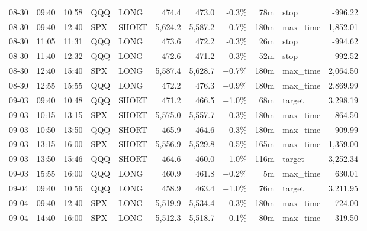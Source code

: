 \documentclass[11pt,a4paper,twoside]{article}
\begin{document}
\begin{center}
\begin{longtable}{>{\color{txtmain}}l l l l l r r r r >{\color{txtmain}}l r}
08-30 & 09:40 & 10:58 & QQQ & LONG & 474.4 & 473.0 & \textcolor{lossred}{-0.3\%} & 78m & stop & \textcolor{lossred}{-996.22} \\
08-30 & 09:40 & 12:40 & SPX & SHORT & 5,624.2 & 5,587.2 & \textcolor{wingreen}{+0.7\%} & 180m & max\_time & \textcolor{wingreen}{1,852.01} \\
08-30 & 11:05 & 11:31 & QQQ & LONG & 473.6 & 472.2 & \textcolor{lossred}{-0.3\%} & 26m & stop & \textcolor{lossred}{-994.62} \\
08-30 & 11:40 & 12:32 & QQQ & LONG & 472.6 & 471.2 & \textcolor{lossred}{-0.3\%} & 52m & stop & \textcolor{lossred}{-992.52} \\
08-30 & 12:40 & 15:40 & SPX & LONG & 5,587.4 & 5,628.7 & \textcolor{wingreen}{+0.7\%} & 180m & max\_time & \textcolor{wingreen}{2,064.50} \\
08-30 & 12:55 & 15:55 & QQQ & LONG & 472.2 & 476.3 & \textcolor{wingreen}{+0.9\%} & 180m & max\_time & \textcolor{wingreen}{2,869.99} \\
09-03 & 09:40 & 10:48 & QQQ & SHORT & 471.2 & 466.5 & \textcolor{wingreen}{+1.0\%} & 68m & target & \textcolor{wingreen}{3,298.19} \\
09-03 & 10:15 & 13:15 & SPX & SHORT & 5,575.0 & 5,557.7 & \textcolor{wingreen}{+0.3\%} & 180m & max\_time & \textcolor{wingreen}{864.50} \\
09-03 & 10:50 & 13:50 & QQQ & SHORT & 465.9 & 464.6 & \textcolor{wingreen}{+0.3\%} & 180m & max\_time & \textcolor{wingreen}{909.99} \\
09-03 & 13:15 & 16:00 & SPX & SHORT & 5,556.9 & 5,529.8 & \textcolor{wingreen}{+0.5\%} & 165m & max\_time & \textcolor{wingreen}{1,359.00} \\
09-03 & 13:50 & 15:46 & QQQ & SHORT & 464.6 & 460.0 & \textcolor{wingreen}{+1.0\%} & 116m & target & \textcolor{wingreen}{3,252.34} \\
09-03 & 15:55 & 16:00 & QQQ & LONG & 460.9 & 461.8 & \textcolor{wingreen}{+0.2\%} & 5m & max\_time & \textcolor{wingreen}{630.01} \\
09-04 & 09:40 & 10:56 & QQQ & LONG & 458.9 & 463.4 & \textcolor{wingreen}{+1.0\%} & 76m & target & \textcolor{wingreen}{3,211.95} \\
09-04 & 09:40 & 12:40 & SPX & LONG & 5,519.9 & 5,534.4 & \textcolor{wingreen}{+0.3\%} & 180m & max\_time & \textcolor{wingreen}{724.00} \\
09-04 & 14:40 & 16:00 & SPX & LONG & 5,512.3 & 5,518.7 & \textcolor{wingreen}{+0.1\%} & 80m & max\_time & \textcolor{wingreen}{319.50} \\

\end{longtable}
\end{center}
\end{document}
